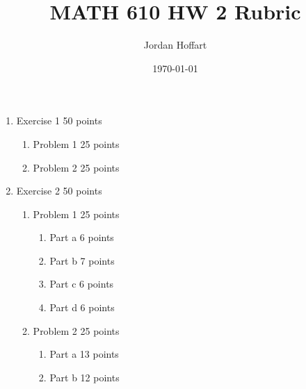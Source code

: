 \documentclass{article}
\title{MATH 610 HW 2 Rubric}
\author{Jordan Hoffart}
\date{\today}
\begin{document}
\maketitle

\begin{enumerate}
  \item Exercise 1 50 points
    \begin{enumerate}
      \item Problem 1 25 points
      \item Problem 2 25 points
    \end{enumerate}
  \item Exercise 2 50 points
    \begin{enumerate}
      \item Problem 1 25 points
        \begin{enumerate}
          \item Part a 6 points
          \item Part b 7 points
          \item Part c 6 points 
          \item Part d 6 points
        \end{enumerate}
      \item Problem 2 25 points
        \begin{enumerate}
          \item Part a 13 points
          \item Part b 12 points
        \end{enumerate}
    \end{enumerate}
\end{enumerate}
\end{document}

